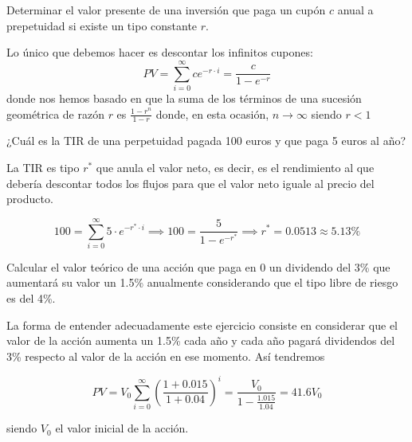 \begin{problem}[6]
Determinar el valor presente de una inversión que paga un cupón $c$ anual a prepetuidad si existe un tipo constante $r$.
\solution

Lo único que debemos hacer es descontar los infinitos cupones:
\[PV = \sum_{i=0}^{\infty}ce^{-r\cdot i} = \frac{c}{1-e^{-r}}\]
donde nos hemos basado en que la suma de los términos de una sucesión geométrica de razón $r$ es $\frac{1-r^n}{1-r}$ donde, en esta ocasión, $n\to \infty$ siendo $r<1$
\end{problem}

\begin{problem}[7]
¿Cuál es la TIR de una perpetuidad pagada 100 euros y que paga 5 euros al año?
\solution

La TIR es tipo $r^*$ que anula el valor neto, es decir, es el rendimiento al que debería descontar todos los flujos para que el valor neto iguale al precio del producto.

\[100 = \sum_{i=0}^{\infty}5\cdot e^{-r^*\cdot i} \implies 100 = \frac{5}{1-e^{-r^*}} \implies r^* =0.0513 \approx 5.13\%\]
\end{problem}

\begin{problem}[8]
Calcular el valor teórico de una acción que paga en 0 un dividendo del 3\%  que aumentará su valor un 1.5\% anualmente considerando que el tipo libre de riesgo es del 4\%.
\solution

La forma de entender adecuadamente este ejercicio consiste en considerar que el valor de la acción aumenta un 1.5\% cada año y cada año pagará dividendos del 3\% respecto al valor de la acción en ese momento. Así tendremos

\[PV = V_0\sum_{i=0}^{\infty}\left(\frac{1+0.015}{1+0.04}\right)^i = \frac{V_0}{1-\frac{1.015}{1.04}} = 41.6 V_0\]

siendo $V_0$ el valor inicial de la acción.
\end{problem}

